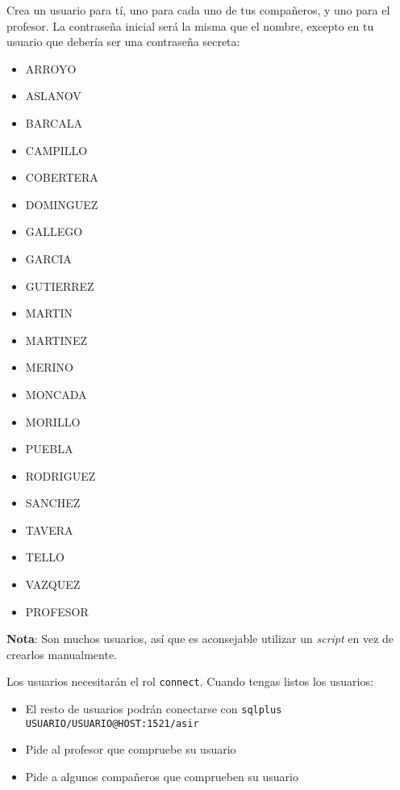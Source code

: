 \begin{homeworkProblem}

  Crea un usuario para tí, uno para cada uno de tus compañeros, y uno para el profesor. La contraseña inicial será la misma que el nombre, excepto en tu usuario que debería ser una contraseña secreta:
  \begin{multicols}{3}
    \begin{itemize}
    \item ARROYO   
    \item ASLANOV  
    \item BARCALA  
    \item CAMPILLO 
    \item COBERTERA
    \item DOMINGUEZ
    \item GALLEGO  
    \item GARCIA   
    \item GUTIERREZ
    \item MARTIN   
    \item MARTINEZ 
    \item MERINO   
    \item MONCADA        
    \item MORILLO  
    \item PUEBLA   
    \item RODRIGUEZ
    \item SANCHEZ  
    \item TAVERA   
    \item TELLO    
    \item VAZQUEZ  
    \item PROFESOR
    \end{itemize}
  \end{multicols}
  {\small \textbf{Nota}: Son muchos usuarios, así que es aconsejable utilizar un \textit{script} en vez de crearlos manualmente.}

  Los usuarios necesitarán el rol \texttt{connect}. Cuando tengas listos los usuarios:
  \begin{itemize}
    \item El resto de usuarios podrán conectarse con \texttt{sqlplus USUARIO/USUARIO@HOST:1521/asir}
    \item Pide al profesor que compruebe su usuario
    \item Pide a algunos compañeros que comprueben su usuario
  \end{itemize}
\end{homeworkProblem}

